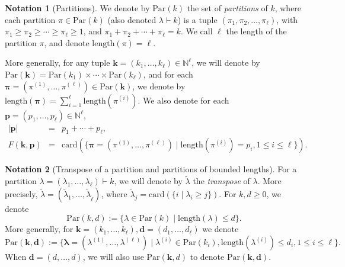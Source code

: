 \documentclass{amsart}
\theoremstyle{definition}
\newtheorem{notation}{Notation}
\theoremstyle{remark}
\numberwithin{equation}{section}
\begin{document}
\begin{notation}[Partitions]
  \label{not:Partition1} 
  We denote by ${\mathrm{Par}}(k)$ the set of \emph{partitions} of $k$, where each partition $\pi \in {\mathrm{Par}}(k)$
  (also denoted $\lambda \vdash k$) 
  is a tuple  $(\pi_{1} , \pi_{2} , \ldots
  , \pi_{\ell})$, with $\pi_{1} \geq \pi_{2} \geq \cdots \geq
  \pi_{\ell} \geq 1$, and $\pi_{1} + \pi_{2} + \cdots + \pi_{\ell} =k$. We
  call $\ell$ the length of the partition $\pi$, and denote
  ${\mathrm{length}}(\pi) = \ell$. 
  {}
  
  
  More generally, for any tuple $\mathbf{k}= (k_{1} , \ldots ,k_{\ell})
  \in {\mathbb{N}}^\ell$, we will denote by
  ${\mathrm{Par}}(\mathbf{k}) = {\mathrm{Par}}(k_{1}) \times \cdots
  \times {\mathrm{Par}}(k_{\ell})$, and for each $\pmb{\pi}= (
  \pi^{(1)} , \ldots , \pi^{(\ell)}) \in
  {\mathrm{Par}}(\mathbf{k})$, we denote by
  ${\mathrm{length}}(\pmb{\pi}) = \sum_{i=1}^{\ell} {\mathrm{length}}(\pi^{(i)})$. 
  We also denote for each $\mathbf{p}= (p_{1} , \ldots , p_{\ell}) \in
  {\mathbb{N}}^{\ell}$,
  \begin{eqnarray*}
    | \mathbf{p} | & = & p_{1} + \cdots + p_{\ell},\\
  
   
   
    F (\mathbf{k},\mathbf{p}) & = & {\mathrm{card}} (\{
    \pmb{\pi}= (\pi^{(1)} , \ldots , \pi^{(\ell)})
    \mid {\mathrm{length}} (\pi^{(i)}) = p_{i} ,  1
    \leq i \leq \ell \}) .
  \end{eqnarray*}
\end{notation}

\begin{notation}[Transpose of a partition and partitions of bounded lengths]
\label{not:Partition2}
For a partition $\lambda =(\lambda_1,\ldots,\lambda_\ell) \vdash k$, we will denote by $\tilde{\lambda}$ the \emph{transpose} of $\lambda$.
More precisely,
$\tilde{\lambda} = (\tilde{\lambda}_1, \ldots,\tilde{\lambda}_{\tilde{\ell}})$, where $\tilde{\lambda}_j = {\mathrm{card}}(\{i \mid \lambda_i \geq j \})$.
For $k,d\geq 0$, we denote 
\[
{\mathrm{Par}}(k,d) := \{ \lambda \in {\mathrm{Par}}(k)  \mid {\mathrm{length}}(\lambda) \leq d \}.
\]
More generally,  for ${\mathbf{k}} = (k_1,\ldots,k_\ell), {\mathbf{d}} = (d_1,\ldots,d_\ell)$ we denote 
\[
{\mathrm{Par}}({\mathbf{k}},{\mathbf{d}}) := \{ \pmb{\lambda} = (\lambda^{(1)},\ldots,\lambda^{(\ell)}) \mid \lambda^{(i)} \in {\mathrm{Par}}(k_i),  {\mathrm{length}}(\lambda^{(i)}) \leq d_i, 1 \leq i \leq \ell \}.
\]
When ${\mathbf{d}} = (d,\ldots,d)$, we will also use ${\mathrm{Par}}({\mathbf{k}},d)$ to denote ${\mathrm{Par}}({\mathbf{k}},{\mathbf{d}})$.
\end{notation}
\end{document}
